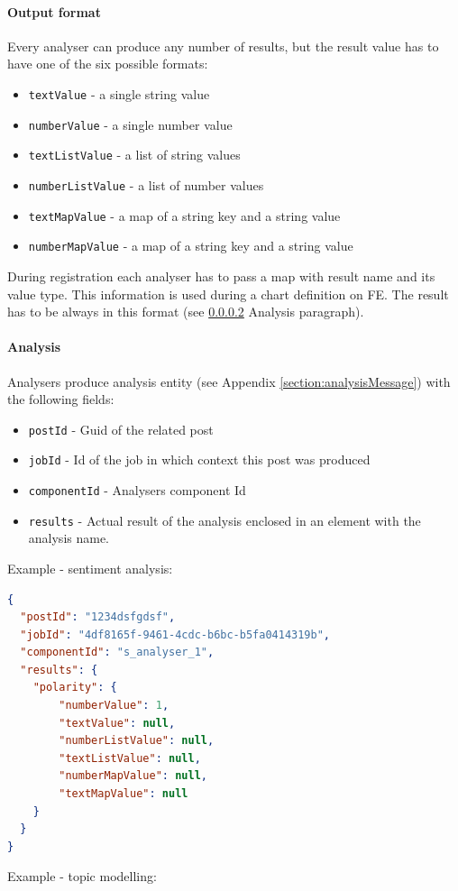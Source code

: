 \paragraph{Output format} Every analyser can produce any number of results, but the result value has to have one of the six possible formats:
\begin{itemize}
    \item \texttt{textValue} - a single string value
    \item \texttt{numberValue} - a single number value
    \item \texttt{textListValue} - a list of string values
    \item \texttt{numberListValue} - a list of number values
    \item \texttt{textMapValue} - a map of a string key and a string value
    \item \texttt{numberMapValue} - a map of a string key and a string value  
\end{itemize}
During registration each analyser has to pass a map with result name and its value type. This information is used during a chart definition on FE. The result has to be always in this format (see \ref{analysis} Analysis paragraph).

\paragraph{Analysis}\label{analysis}

Analysers produce analysis entity (see Appendix \ref{section:analysisMessage}) with the following fields:

\begin{itemize}
    \item \texttt{postId} - Guid of the related post
    \item \texttt{jobId} - Id of the job in which context this post was produced
    \item \texttt{componentId} - Analysers component Id
    \item \texttt{results} - Actual result of the analysis enclosed in an element with the analysis name.
\end{itemize}

\vspace{3\baselineskip}
Example - sentiment analysis: 

\begin{lstlisting}[language=json,firstnumber=1]
{
  "postId": "1234dsfgdsf",
  "jobId": "4df8165f-9461-4cdc-b6bc-b5fa0414319b",
  "componentId": "s_analyser_1",
  "results": {
    "polarity": {
        "numberValue": 1,
        "textValue": null,
        "numberListValue": null,
        "textListValue": null,
        "numberMapValue": null,
        "textMapValue": null
    }
  }
}
\end{lstlisting}
\newpage
Example - topic modelling: 

